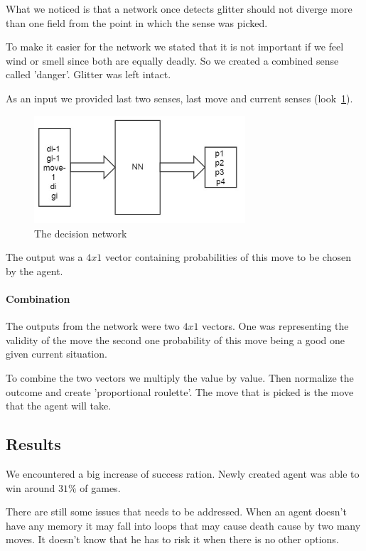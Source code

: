 \documentclass[a4paper]{article}
\begin{document}
What we noticed is that a network once detects glitter should not diverge more than one field from the point in which the sense was picked.

To make it easier for the network we stated that it is not important if we feel wind or smell since both are equally deadly. So we created a combined sense called 'danger'. Glitter was left intact.

As an input we provided last two senses, last move and current senses (look~\ref{pic:decionMoves}).

\begin{figure}[!h]
		\centering	
		\includegraphics[width=0.7\textwidth]{pic/decisionNet.jpg}
		\caption{The decision network}
		\label{pic:decionMoves}
	\end{figure}

The output was a $4x1$ vector containing probabilities of this move to be chosen by the agent.

\paragraph{Combination}
	The outputs from the network were two $4x1$ vectors. One was representing the validity of the move the second one probability of this move being a good one given current situation.
	
	To combine the two vectors we multiply the value by value. Then normalize the outcome and create 'proportional roulette'. The move that is picked is the move that the agent will take.  

\subsection{Results}
	We encountered a big increase of success ration. Newly created agent was able to win around $31\%$ of games. 
	
	There are still some issues that needs to be addressed.	When an agent doesn't have any memory it may fall into loops that may cause death cause by two many moves. It doesn't know that he has to risk it when there is no other options.
\end{document}

